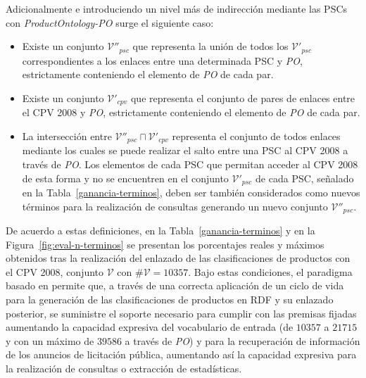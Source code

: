 \documentclass[a4paper,final,11pt,fleqn,twoside]{book}  %
\begin{document}
Adicionalmente e introduciendo un nivel más de indirección mediante las PSCs con \textit{ProductOntology-PO} surge el siguiente caso:
\begin{itemize}
 \item Existe un conjunto $\mathcal{V''}_{psc}$ que representa la unión de todos los $\mathcal{V'}_{psc}$ correspondientes 
a los enlaces entre una determinada PSC y \textit{PO}, estrictamente conteniendo el elemento de \textit{PO} de cada par.
\item Existe un conjunto $\mathcal{V'}_{cpv}$ que representa el conjunto de pares de enlaces entre el CPV 2008 y \textit{PO}, 
estrictamente conteniendo el elemento de \textit{PO} de cada par.
\item La intersección entre $\mathcal{V''}_{psc} \sqcap \mathcal{V'}_{cpv}$ representa el conjunto de todos enlaces mediante 
los cuales se puede realizar el salto entre una PSC al CPV 2008 a través de \textit{PO}. Los elementos 
de cada PSC que permitan acceder al CPV 2008 de esta forma y no se encuentren en el conjunto $\mathcal{V'}_{psc}$ de cada PSC, señalado 
en la Tabla~\ref{ganancia-terminos}, deben ser también considerados como nuevos términos para la realización de consultas generando 
un nuevo conjunto $\mathcal{V''}_{psc}$.
\end{itemize}

De acuerdo a estas definiciones, en la Tabla~\ref{ganancia-terminos} y en la Figura~\ref{fig:eval-n-terminos} 
se presentan los porcentajes reales y máximos obtenidos tras la realización del enlazado de las clasificaciones 
de productos con el CPV 2008, conjunto $\mathcal{V}$ con $\#\mathcal{V} = 10357$. Bajo estas condiciones, 
el paradigma basado en \linkeddata permite que, a través de una correcta aplicación de un ciclo de vida para la generación 
de las clasificaciones de productos en RDF y su enlazado posterior, se suministre el soporte necesario para cumplir con 
las premisas fijadas aumentando la capacidad expresiva del vocabulario de entrada (de $10357$ a $21715$ y con 
un máximo de $39586$ a través de \textit{PO}) y para la recuperación de información de los anuncios de licitación pública, 
aumentando así la capacidad expresiva para la realización de consultas o extracción de estadísticas. 
\end{document}

